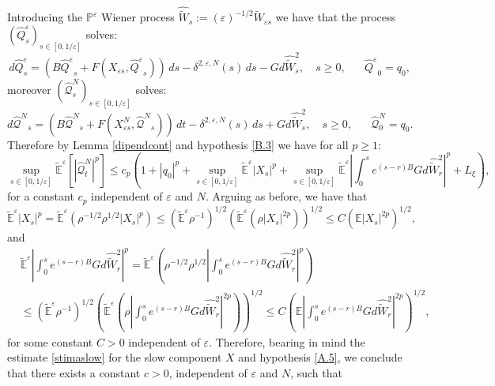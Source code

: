 \documentclass[reqno,a4paper,11 pt]{article}
\def \E {\mathbb{E}}
\def \e {\varepsilon}
\numberwithin{equation}{section}
\begin{document}
Introducing the $\mathbb{P}^{\e}$ Wiener process $\hat{\widetilde{W}}_s:= (\e)^{-1/2}\widetilde{W}_{\e s}$ we have that the process $(\hat{Q}^{\e}_s)_{s\in [0,1/\e]}$ solves:
\begin{equation} \label{quicktilde}
\, d\hat{Q}^{\e}_s=(B{\hat{Q}^{\e}}_s+ F({X}_{ \e s},{\hat{Q}^{\e}}_s))\,ds -\delta^{2,\e,N}(s)\,ds-  Gd\hat{\widetilde{W}}^2_s , \quad s \geq 0,
\hspace{20pt} {\hat{Q}^{\e}}_0={q_0},
\end{equation}
moreover $(\hat{\mathcal{Q}}^{N}_{ s})_{s\in [0,1/\e]}$ solves:
\begin{equation} \label{quicktildeN}
d{\hat{\mathcal{Q}}^{N}}_s=(B{\hat{\mathcal{Q}}^N}_s+ F({X}^N_{\e s },{\hat{\mathcal{Q}}^{N}}_s))\,dt - \delta^{2,\e,N}( s)\,ds+ G d\hat{\widetilde{W}}^2_s, \quad s \geq 0,
\hspace{20pt} \hat{\mathcal{Q}}^{N}_0={q_0}.
\end{equation}
    Therefore by Lemma \ref{dipendcont} and hypothesis  \ref{B.3} we have for all $p\geq 1$:
\begin{equation}
\sup_{s \in [0, 1/\e] } \widetilde{\E}^\e[|\hat{\mathcal{Q}}^{N}_t|^p]\leq c_p\left(1+|q_0|^p+\sup_{s \in [0, 1/\e]} \widetilde{\E}^\e |X_s|^p + \sup_{s \in [0, 1/\e]} \widetilde{\E}^\e \left | \int_0^{s} e^{(s-r) B}   G d\hat{\widetilde{W}}^2_r \right|^p+ L_{\xi}\right),
\end{equation}
for a constant $c_p$ independent of  $\e$ and $N$.
Arguing as before, we have that
\[  \widetilde{\E}^\e |X_s|^p= \widetilde{\E}^\e ( \rho^{-1/2}  \rho^{1/2}|X_s|^p) \leq   (\widetilde{\E}^\e  \rho ^{-1})^{1/2}    (\widetilde{\E}^\e  ( \rho|X_s|^{2p}))^{1/2} \leq C 
  (\E  |X_s|^{2p})^{1/2}, \]
 and 
 \begin{align*} 
 & \displaystyle\widetilde{\E}^\e\left|\int_0^{s} e^{(s-r) B}   G d\hat{\widetilde{W}}^2_r\right|^p= \widetilde{\E}^\e \left( \rho^{-1/2}  \rho^{1/2}\left|\int_0^{s} e^{(s-r) B}   G d\hat{\widetilde{W}}^2_r\right|^p \right)  \\
  & \leq  (\widetilde{\E}^\e  \rho ^{-1})^{1/2}    \left(\widetilde{\E}^\e  \left( \rho\left|\int_0^{s} e^{(s-r) B}   G d\hat{\widetilde{W}}^2_r\right|^{2p}\right)\right)^{1/2} \leq C 
  \left(\E  \left|\int_0^{s} e^{(s-r) B}   G d\hat{\widetilde{W}}^2_r\right|^{2p}\right)^{1/2}, 
  \end{align*}
  for some constant $C>0$ independent of $\e$.
Therefore,   bearing in mind the estimate \eqref{stimaslow} for the slow component $X$ and hypothesis  \ref{A.5},  we conclude that there exists a constant $c >0$, independent of $\e $ and $N$, such that
\end{document}
